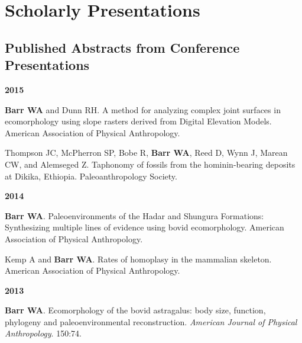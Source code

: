 \documentclass{article}
\begin{document}
\section*{Scholarly Presentations}

\subsection*{Published Abstracts from Conference Presentations}

\begin{description*}
\begin{minipage}{\linewidth}
\item[] {\bfseries 2015}
\item[] {\bfseries Barr WA} and Dunn RH. A method for analyzing complex joint surfaces in ecomorphology using slope rasters derived from Digital Elevation Models. American Association of Physical Anthropology.
\item[] Thompson JC, McPherron SP, Bobe R, {\bfseries Barr WA}, Reed D, Wynn J, Marean CW, and Alemseged Z. Taphonomy of fossils from the hominin-bearing deposits at Dikika, Ethiopia. Paleoanthropology Society.
\end{minipage}
\end{description*}



\begin{description*}
\begin{minipage}{\linewidth}
\item[] {\bfseries 2014}
\item[] {\bfseries Barr WA}. Paleoenvironments of the Hadar and Shungura Formations: Synthesizing multiple lines of evidence using bovid ecomorphology. American Association of Physical Anthropology.
\item[] Kemp A and {\bfseries Barr WA}. Rates of homoplasy in the mammalian skeleton. American Association of Physical Anthropology.
\end{minipage}
\end{description*}



\begin{description*}
\begin{minipage}{\linewidth}
\item[] {\bfseries 2013}
\item[] {\bfseries Barr WA}. Ecomorphology of the bovid astragalus: body size, function, phylogeny and paleoenvironmental reconstruction. \emph{American Journal of Physical Anthropology}. 150:74.
\end{minipage}
\end{description*}
\end{document}
